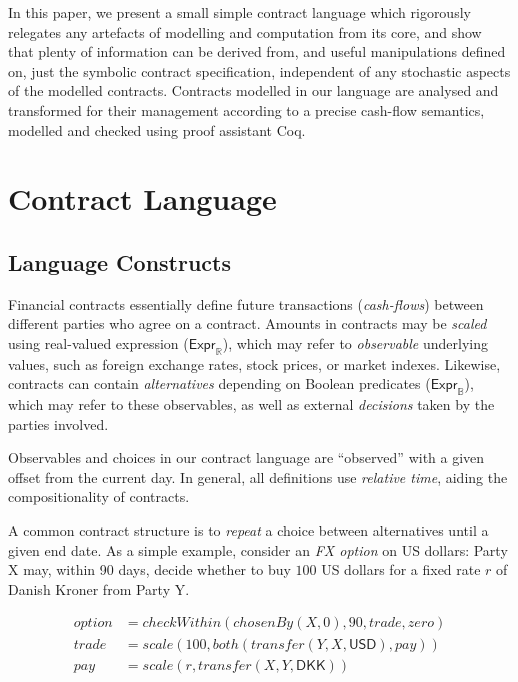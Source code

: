 \documentclass[a4paper,debug,twocolumn]{easychair}
\newcommand\type[1]{\mathsf{#1}}
\newcommand\reals{{\mathbb R}}
\newcommand\bools{{\mathbb B}}
\theoremstyle{plain}
\begin{document}
In this paper, we present a small simple contract language which rigorously
relegates any artefacts of modelling and computation from its core, and show
that plenty of information can be derived from, and useful manipulations defined
on, just the symbolic contract specification, independent of any stochastic
aspects of the modelled contracts.
Contracts modelled in our language are analysed and transformed for their
management according to a precise cash-flow semantics, modelled and checked
using proof assistant Coq.


\section{Contract Language}
\label{sec:contract-language}

\subsection{Language Constructs}
\label{sec:language-constructs}

Financial contracts essentially define future transactions (\emph{cash-flows})
between different parties who agree on a contract.
Amounts in contracts may be \emph{scaled} using real-valued expression
($\type{Expr}_\reals$), which may refer to \emph{observable} underlying
values, such as foreign exchange rates, stock prices, or market indexes.
Likewise, contracts can contain \emph{alternatives} depending on Boolean
predicates ($\type{Expr}_\bools$), which may refer to these observables,
as well as external \emph{decisions} taken by the parties involved.

Observables and choices in our contract language are ``observed'' with
a given offset from the current day.
In general, all definitions use \emph{relative time},
aiding the compositionality of contracts.  

A common contract structure is to \emph{repeat} a choice
between alternatives until a given end date.
As a simple example, consider an \emph{FX option} on US dollars:
Party X may, within 90 days, decide whether to buy $100$ US dollars for
a fixed rate $r$ of Danish Kroner from Party Y.

\vspace*{-2ex}
{\footnotesize
\begin{align*}
\mathit{option} &= \mathit{checkWithin}(\mathit{chosenBy}(X,0), 90, \mathit{trade}, \mathit{zero})\\
\mathit{trade} &= \mathit{scale}(100, both(\mathit{transfer}(Y, X,\type{USD}), pay))\\
\mathit{pay} &= \mathit{scale}(r, \mathit{transfer}(X, Y,\type{DKK}))
\end{align*}

}
%
\end{document}
